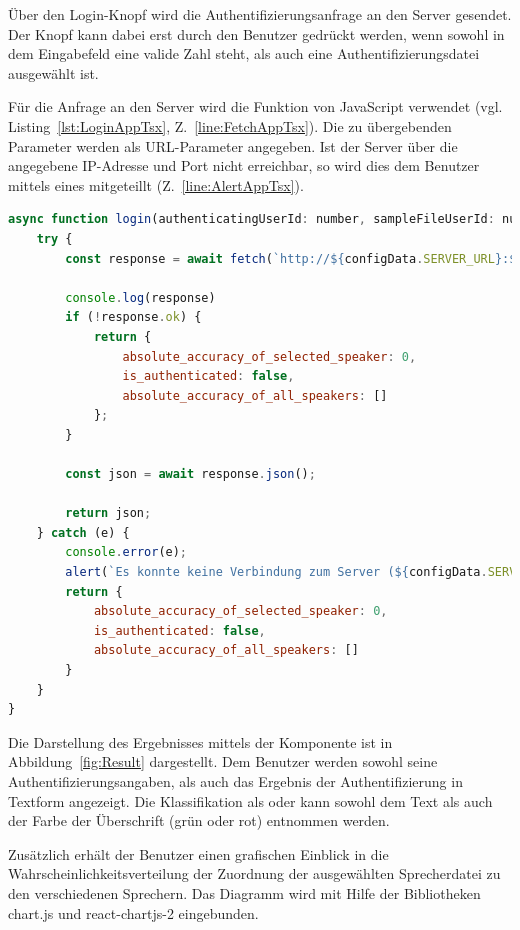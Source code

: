 Über den Login-Knopf wird die Authentifizierungsanfrage an den Server gesendet.
Der Knopf kann dabei erst durch den Benutzer gedrückt werden, wenn sowohl in dem Eingabefeld eine valide Zahl steht, als auch eine Authentifizierungsdatei ausgewählt ist.

Für die Anfrage an den Server wird die  Funktion von JavaScript verwendet (vgl. Listing~\ref{lst:LoginAppTsx}, Z.~\ref{line:FetchAppTsx}).
Die zu übergebenden Parameter werden als URL-Parameter angegeben.
Ist der Server über die angegebene IP-Adresse und Port nicht erreichbar, so wird dies dem Benutzer mittels eines  mitgeteillt (Z.~\ref{line:AlertAppTsx}).
\begin{lstlisting}[language=JavaScript,caption=login() - App.tsx,label=lst:LoginAppTsx]
async function login(authenticatingUserId: number, sampleFileUserId: number, sampleFileIndex: number) {
    try {
        const response = await fetch(`http://${configData.SERVER_URL}:${configData.SERVER_PORT}/?speaker_id=${sampleFileUserId}&sample_id=${sampleFileIndex}&selected_speaker_id=${authenticatingUserId}`); //(*@\label{line:FetchAppTsx}@*)
    
        console.log(response)
        if (!response.ok) {
            return { 
                absolute_accuracy_of_selected_speaker: 0,
                is_authenticated: false,
                absolute_accuracy_of_all_speakers: []
            };
        }
    
        const json = await response.json();
        
        return json;
    } catch (e) {
        console.error(e);
        alert(`Es konnte keine Verbindung zum Server (${configData.SERVER_URL}:${configData.SERVER_PORT}) hergestellt werden!`) //(*@\label{line:AlertAppTsx}@*)
        return {
            absolute_accuracy_of_selected_speaker: 0,
            is_authenticated: false,
            absolute_accuracy_of_all_speakers: []
        }
    }
}
\end{lstlisting}

Die Darstellung des Ergebnisses mittels der  Komponente ist in Abbildung~\ref{fig:Result} dargestellt.
Dem Benutzer werden sowohl seine Authentifizierungsangaben, als auch das Ergebnis der Authentifizierung in Textform angezeigt.
Die Klassifikation als  oder  kann sowohl dem Text als auch der Farbe der Überschrift (grün oder rot) entnommen werden.

Zusätzlich erhält der Benutzer einen grafischen Einblick in die Wahrscheinlichkeitsverteilung der Zuordnung der ausgewählten Sprecherdatei zu den verschiedenen Sprechern.
Das Diagramm wird mit Hilfe der Bibliotheken chart.js und react-chartjs-2 eingebunden.

